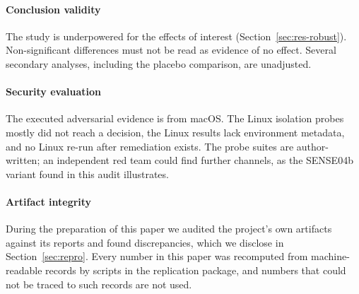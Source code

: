 \paragraph*{Conclusion validity} The study is underpowered for the effects of interest (Section~\ref{sec:res-robust}). Non-significant differences must not be read as evidence of no effect. Several secondary analyses, including the placebo comparison, are unadjusted.

\paragraph*{Security evaluation} The executed adversarial evidence is from macOS. The Linux isolation probes mostly did not reach a decision, the Linux results lack environment metadata, and no Linux re-run after remediation exists. The probe suites are author-written; an independent red team could find further channels, as the SENSE04b variant found in this audit illustrates.

\paragraph*{Artifact integrity} During the preparation of this paper we audited the project's own artifacts against its reports and found discrepancies, which we disclose in Section~\ref{sec:repro}. Every number in this paper was recomputed from machine-readable records by scripts in the replication package, and numbers that could not be traced to such records are not used.
